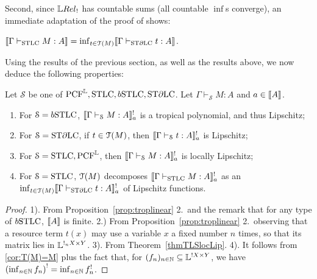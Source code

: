 Second, since $\LREL_!$ has countable sums (all countable $\inf$s converge), an immediate adaptation of the proof of \cite[Theorem 4.23]{Manzo2012} shows:

\begin{corollary}\label{cor:T(M)=M}
$\llbracket\Gamma\vdash_{\mathrm{STLC}} M:A\rrbracket=\inf_{t\in\mathcal{T}(M)} \llbracket\Gamma\vdash_{\mathrm{ST}\partial\mathrm{LC}} t:A\rrbracket$. %
\end{corollary}




Using the results of the previous section, as well as the results above, we now deduce the following properties:

\begin{theorem}\label{thm:taylor}
Let $\mathcal S$ be one of $\RM{PCF}^{\Lawv},\STLC,\BSTLC,\STDLC$. Let $\Gamma\vdash_{\mathcal S}M:A$ and $a\in \llbracket A\rrbracket$.
\begin{enumerate}
\item For $\mathcal S=\BSTLC$, $\llbracket\Gamma\vdash_{\mathcal S}M:A\rrbracket^{!}_{a}$ is a tropical polynomial, and thus Lipschitz;

\item For $\mathcal S=\mathrm{ST}\partial\mathrm{LC}$, if $t\in \mathcal{T}(M)$, then $\llbracket\Gamma\vdash_{\mathcal S}t:A\rrbracket^{!}_{a}$ is Lipschitz;

\item For $\mathcal S=\mathrm{STLC},\mathrm{PCF}^{\mathbb{L}}$, then $\llbracket\Gamma\vdash_{\mathcal S}M:A\rrbracket^{!}_{a}$ is locally Lipschitz;

\item For $\mathcal S=\mathrm{STLC}$, $\mathcal{T}(M)$ decomposes $\llbracket\Gamma \vdash_{\mathrm{STLC}} M:A\rrbracket^!_{a}$ as an $\inf_{t\in\mathcal{T}(M)}\llbracket\Gamma\vdash_{\mathrm{ST}\partial\mathrm{LC}} t:A\rrbracket^!_{a}$ of {Lipschitz} functions.
\end{enumerate}

\end{theorem}
\begin{proof}
1). From Proposition~\ref{prop:troplinear} 2.~and the remark that for any type of $\BSTLC$, $\llbracket A\rrbracket$ is finite.
2.) From Proposition~\ref{prop:troplinear} 2.~observing that a resource term $t(x)$ may use a variable $x$ a fixed number $n$ times, so that its matrix lies in $\mathbb{L}^{!_{n}X\times Y}$. 
3). From Theorem~\ref{thmTLSlocLip}.
4). It follows from \autoref{cor:T(M)=M} plus the fact that, for $(f_n)_{n\in\mathbb{N}}\subseteq\mathbb{L}^{!X\times Y}$, we have 
$\left(\inf_{n\in\mathbb{N}} f_n\right)^!=\inf_{n\in\mathbb{N}} f_n^!$.
\end{proof}




